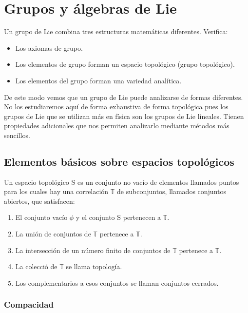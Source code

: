 \documentclass{article}
\begin{document}
%
%
  
\newpage

\section{ Grupos y álgebras de Lie}

Un grupo de Lie combina tres estructuras matemáticas diferentes. Verifica:

\begin{itemize}
    \item Los axiomas de grupo.
    \item Los elementos de grupo forman un espacio topológico (grupo topológico).
    \item Los elementos del grupo forman una variedad analítica.
\end{itemize}

De este modo vemos que un grupo de Lie puede analizarse de formas diferentes. No los estudiaremos aquí de forma exhaustiva de forma topológica pues los grupos de Lie que se utilizan más en física son los grupos de Lie lineales. Tienen propiedades adicionales que nos permiten analizarlo mediante métodos más sencillos.

\subsection{Elementos básicos sobre espacios topológicos}

Un espacio topológico S es un conjunto no vacío de elementos llamados puntos para los cuales hay una correlación $\mathds{T}$ de subconjuntos, llamados conjuntos abiertos, que satisfacen:

\begin{enumerate}
    \item El conjunto vacío $\phi$ y el conjunto S pertenecen a $\mathds{T}$.
    \item La unión de conjuntos de $\mathds{T}$ pertenece a $\mathds{T}$.
    \item La intersección de un número finito de conjuntos de $\mathds{T}$ pertenece a $\mathds{T}$.
    \item La colecció de $\mathds{T}$ se llama topología.
    \item Los complementarios a esos conjuntos se llaman conjuntos cerrados.
\end{enumerate}

\subsubsection{Compacidad}
\end{document}
